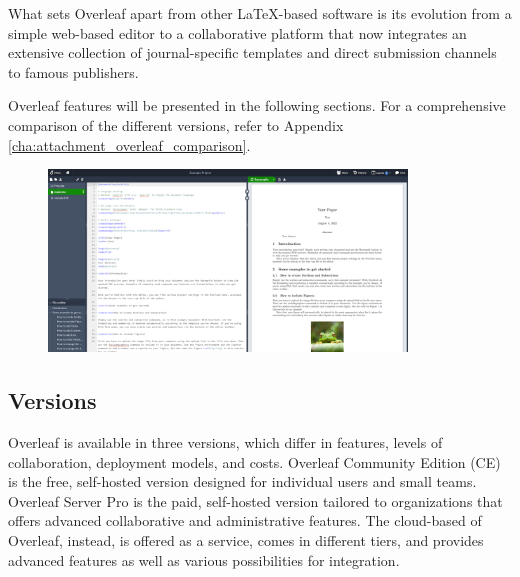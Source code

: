 What sets Overleaf apart from other LaTeX-based software is its evolution from a simple web-based editor to a collaborative platform that now integrates an extensive collection of journal-specific templates and direct submission channels to famous publishers.  

Overleaf features will be presented in the following sections. For a comprehensive comparison of the different versions, refer to Appendix \ref{cha:attachment_overleaf_comparison}.

\bigskip

\begin{figure}[ht!]
  \centering
  \includegraphics[width=0.85\textwidth]{img/overleaf.png}
  \caption{}
  \label{fig:overleaf_screenshot}
\end{figure}

\subsection{Versions}
\label{subsec:overleaf-versions}
Overleaf is available in three versions, which differ in features, levels of collaboration, deployment models, and costs.
Overleaf Community Edition (CE) is the free, self-hosted version designed for individual users and small teams. Overleaf Server Pro is the paid, self-hosted version tailored to organizations that offers advanced collaborative and administrative features. The cloud-based of Overleaf, instead, is offered as a service, comes in different tiers, and provides advanced features as well as various possibilities for integration.

